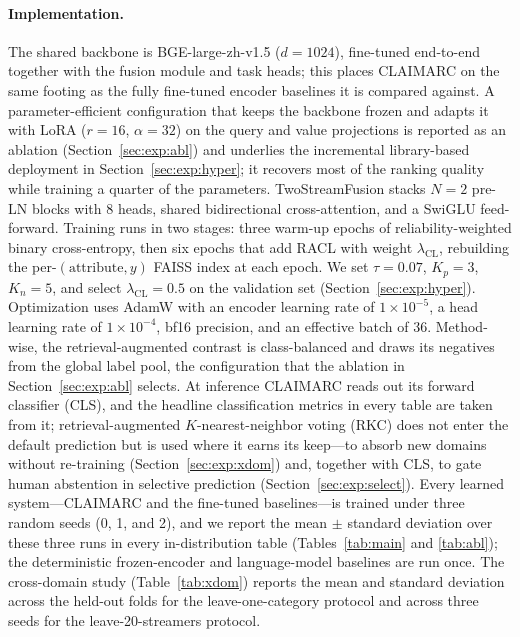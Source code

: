 \documentclass[11pt]{article}
\begin{document}
\paragraph{Implementation.}
The shared backbone is BGE-large-zh-v1.5 ($d{=}1024$), fine-tuned end-to-end
together with the fusion module and task heads; this places CLAIMARC on the same
footing as the fully fine-tuned encoder baselines it is compared against. A
parameter-efficient configuration that keeps the backbone frozen and adapts it
with LoRA ($r{=}16$, $\alpha{=}32$) on the query and value projections is
reported as an ablation (Section~\ref{sec:exp:abl}) and underlies the incremental
library-based deployment in Section~\ref{sec:exp:hyper}; it recovers most of the
ranking quality while training a quarter of the parameters.
TwoStreamFusion stacks $N{=}2$ pre-LN blocks with 8 heads, shared bidirectional
cross-attention, and a SwiGLU feed-forward. Training runs in two stages: three
warm-up epochs of reliability-weighted binary cross-entropy, then six epochs
that add RACL with weight $\lambda_{\mathrm{CL}}$, rebuilding the
per-$(\text{attribute},y)$ FAISS index at each epoch. We set $\tau{=}0.07$,
$K_p{=}3$, $K_n{=}5$, and select $\lambda_{\mathrm{CL}}{=}0.5$ on the
validation set (Section~\ref{sec:exp:hyper}). Optimization uses AdamW with an
encoder learning rate of $1{\times}10^{-5}$, a head learning rate of
$1{\times}10^{-4}$, bf16 precision, and an effective batch of 36. Method-wise,
the retrieval-augmented contrast is class-balanced and draws its negatives from
the global label pool, the configuration that the ablation in
Section~\ref{sec:exp:abl} selects. At inference CLAIMARC reads out its forward
classifier (CLS), and the headline classification metrics in every table are
taken from it; retrieval-augmented $K$-nearest-neighbor voting (RKC) does not
enter the default prediction but is used where it earns its keep---to absorb new
domains without re-training (Section~\ref{sec:exp:xdom}) and, together with CLS,
to gate human abstention in selective prediction
(Section~\ref{sec:exp:select}). Every learned system---CLAIMARC and the
fine-tuned baselines---is trained under three random seeds (0, 1, and 2), and we
report the mean $\pm$ standard deviation over these three runs in every
in-distribution table (Tables~\ref{tab:main} and \ref{tab:abl}); the
deterministic frozen-encoder and language-model baselines are run once. The
cross-domain study (Table~\ref{tab:xdom}) reports the mean and standard
deviation across the held-out folds for the leave-one-category protocol and
across three seeds for the leave-20-streamers protocol.
\end{document}
